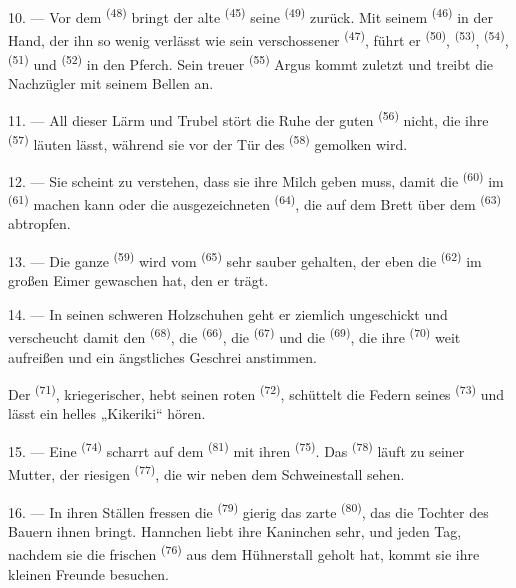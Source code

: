 10. --- Vor dem  \textsuperscript{(48)} bringt der alte
 \textsuperscript{(45)} seine  \textsuperscript{(49)}
zurück. Mit seinem  \textsuperscript{(46)} in der Hand, der ihn so
wenig verlässt wie sein verschossener  \textsuperscript{(47)}, führt
er  \textsuperscript{(50)}, 
\textsuperscript{(53)},  \textsuperscript{(54)}, 
\textsuperscript{(51)} und  \textsuperscript{(52)} in den Pferch.
Sein treuer  \textsuperscript{(55)} Argus kommt zuletzt und treibt die
Nachzügler mit seinem Bellen an.

11. --- All dieser Lärm und Trubel stört die Ruhe der guten 
\textsuperscript{(56)} nicht, die ihre  \textsuperscript{(57)} läuten
lässt, während sie vor der Tür des  \textsuperscript{(58)} gemolken
wird.

12. --- Sie scheint zu verstehen, dass sie ihre Milch geben muss, damit die
 \textsuperscript{(60)} im 
\textsuperscript{(61)}  machen kann oder die ausgezeichneten
 \textsuperscript{(64)}, die auf dem Brett über dem 
\textsuperscript{(63)} abtropfen.

13. --- Die ganze  \textsuperscript{(59)} wird vom
 \textsuperscript{(65)} sehr sauber gehalten, der eben die
 \textsuperscript{(62)} im großen Eimer gewaschen hat, den er
trägt.

\VUsaut{3.0mm}
\VUsaut{3.0mm}

14. --- In seinen schweren Holzschuhen geht er ziemlich ungeschickt und verscheucht
damit den  \textsuperscript{(68)}, die 
\textsuperscript{(66)}, die  \textsuperscript{(67)} und die
 \textsuperscript{(69)}, die ihre 
\textsuperscript{(70)} weit aufreißen und ein ängstliches Geschrei anstimmen.

Der  \textsuperscript{(71)}, kriegerischer, hebt seinen roten
 \textsuperscript{(72)}, schüttelt die Federn seines
 \textsuperscript{(73)} und lässt ein helles „Kikeriki“ hören.

15. --- Eine  \textsuperscript{(74)} scharrt auf dem
 \textsuperscript{(81)} mit ihren 
\textsuperscript{(75)}. Das
 \textsuperscript{(78)} läuft zu seiner Mutter, der riesigen
 \textsuperscript{(77)}, die wir neben dem Schweinestall sehen.

16. --- In ihren Ställen fressen die  \textsuperscript{(79)} gierig
das zarte  \textsuperscript{(80)}, das die Tochter des Bauern ihnen
bringt. Hannchen liebt ihre Kaninchen sehr, und jeden Tag, nachdem sie die frischen
 \textsuperscript{(76)} aus dem Hühnerstall geholt hat, kommt sie ihre
kleinen Freunde besuchen.
\VUsaut{6.0mm}
\VUfilet{22mm}
